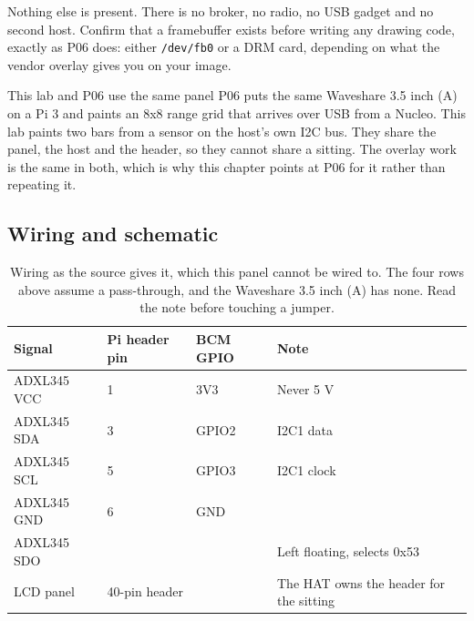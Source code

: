 Nothing else is present. There is no broker, no radio, no USB gadget and no second host. Confirm that a framebuffer exists before writing any drawing code, exactly as P06 does: either \texttt{/dev/fb0} or a DRM card, depending on what the vendor overlay gives you on your image.

\begin{note}{This lab and P06 use the same panel}
P06 puts the same Waveshare 3.5 inch (A) on a Pi 3 and paints an 8x8 range grid that arrives over USB from a Nucleo. This lab paints two bars from a sensor on the host's own I2C bus. They share the panel, the host and the header, so they cannot share a sitting. The overlay work is the same in both, which is why this chapter points at P06 for it rather than repeating it.
\end{note}

\subsection*{Wiring and schematic}


\begin{table}[H]\centering\small
\begin{tabular}{p{42mm}p{26mm}p{22mm}p{58mm}}
\toprule
Signal & Pi header pin & BCM GPIO & Note \\
\midrule
ADXL345 VCC & 1 & 3V3 & Never 5 V \\
ADXL345 SDA & 3 & GPIO2 & I2C1 data \\
ADXL345 SCL & 5 & GPIO3 & I2C1 clock \\
ADXL345 GND & 6 & GND & \\
ADXL345 SDO & & & Left floating, selects 0x53 \\
LCD panel & 40-pin header & & The HAT owns the header for the sitting \\
\bottomrule
\end{tabular}
\caption{Wiring as the source gives it, which this panel cannot be wired to. The four rows above assume a pass-through, and the Waveshare 3.5 inch (A) has none. Read the note before touching a jumper.}
\end{table}

